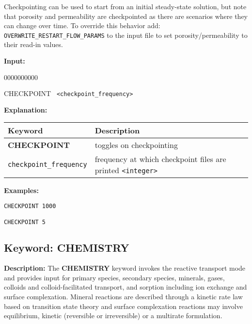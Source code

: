 Checkpointing can be used to start from an initial steady-state solution, but note that porosity and permeability are checkpointed as there are scenarios where they can change over time. To override this behavior add: {\tt OVERWRITE\_RESTART\_FLOW\_PARAMS} to the input file to set porosity/permeability to their read-in values.

{\noindent\bf Input:}

\begin{deflist}{0000000000}
\item [CHECKPOINT] \ {\tt <checkpoint\_frequency>}
\end{deflist}

{\noindent\bf Explanation:}

\begin{center}
\begin{tabularx}{\linewidth}{lX}
\toprule[1.5pt]
\bf Keyword & \bf Description\\
\midrule
\bf CHECKPOINT & toggles on checkpointing \\
{\tt checkpoint\_frequency} & frequency at which checkpoint files are printed {\tt<integer>} \\
\bottomrule
\end{tabularx}
\end{center}

\bigskip

\begin{mdframed}

{\noindent\bf Examples:}
\begin{verbatim}
CHECKPOINT 1000

CHECKPOINT 5
\end{verbatim}

\end{mdframed}

\hyperlink{target_key}{\return}

\newpage
\protect\hypertarget{target_chem}{}

\subsection{Keyword: CHEMISTRY}

\noindent
{\bf Description:}
The {\bf CHEMISTRY} keyword invokes the reactive transport mode and provides input for primary species, secondary species, minerals, gases, colloids and colloid-facilitated transport, and sorption including ion exchange and surface complexation. Mineral reactions are described through a kinetic rate law based on transition state theory and surface complexation reactions may involve equilibrium, kinetic (reversible or irreversible) or a multirate formulation.


